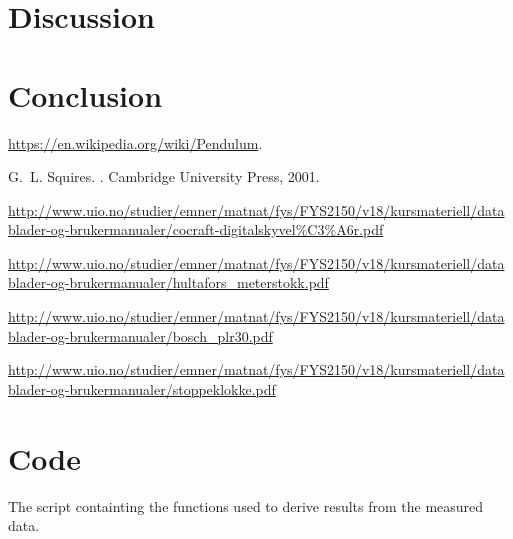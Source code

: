 \documentclass[11pt,a4paper]{article}
\begin{document}
\section{\label{sec:disc}Discussion}
\section{\label{sec:conc}Conclusion}


\begin{thebibliography}{1}

\url{https://en.wikipedia.org/wiki/Pendulum}.

G.~L. Squires.
.
\newblock Cambridge University Press, 2001.

\url{http://www.uio.no/studier/emner/matnat/fys/FYS2150/v18/kursmateriell/datablader-og-brukermanualer/cocraft-digitalskyvel%C3%A6r.pdf}

\url{http://www.uio.no/studier/emner/matnat/fys/FYS2150/v18/kursmateriell/datablader-og-brukermanualer/hultafors_meterstokk.pdf}

\url{http://www.uio.no/studier/emner/matnat/fys/FYS2150/v18/kursmateriell/datablader-og-brukermanualer/bosch_plr30.pdf}

\url{http://www.uio.no/studier/emner/matnat/fys/FYS2150/v18/kursmateriell/datablader-og-brukermanualer/stoppeklokke.pdf}

\end{thebibliography}

\section{Code}
The script containting the functions used to derive results from the measured data.

\end{document}
